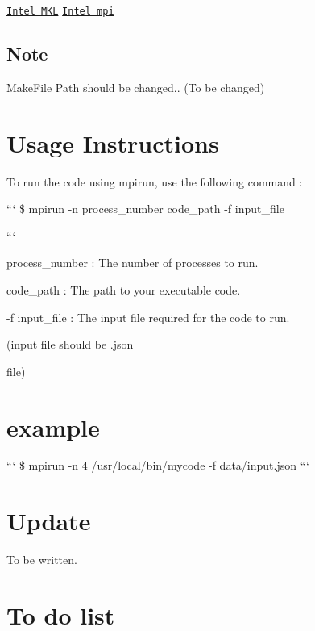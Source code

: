 \href{https://www.intel.com/content/www/us/en/developer/tools/oneapi/onemkl.html}{\tt Intel M\-K\-L} \href{https://www.intel.com/content/www/us/en/developer/tools/oneapi/mpi-library.html#gs.b1bib5}{\tt Intel mpi}

\subsection*{Note}

Make\-File Path should be changed.. (To be changed)

\section*{Usage Instructions }

To run the code using {\ttfamily mpirun}, use the following command \-:

``` \$ mpirun -\/n process\-\_\-number code\-\_\-path -\/f input\-\_\-file

```


\begin{DoxyItemize}
\item process\-\_\-number \-: The number of processes to run.
\item code\-\_\-path \-: The path to your executable code.
\item -\/f input\-\_\-file \-: The input file required for the code to run.
\begin{DoxyItemize}
\item (input file should be {\ttfamily .json}\par
 file)
\end{DoxyItemize}
\end{DoxyItemize}

\section*{example}

``` \$ mpirun -\/n 4 /usr/local/bin/mycode -\/f data/input.\-json ```

\section*{Update }

{\ttfamily To be written.}

\section*{To do list }


